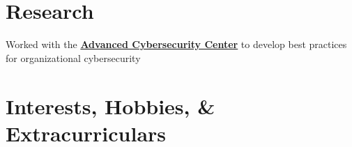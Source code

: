 \documentclass[letterpaper]{deedy-resume} %
\begin{document}
\begin{minipage}[t]{0.66\textwidth}






\section{Research}


Worked with the \textbf{\href{http://www.acscenter.org/}{Advanced Cybersecurity Center}} to develop best practices for organizational cybersecurity

\sectionspace %






\section{Interests, Hobbies, \& Extracurriculars}


\end{minipage}
\end{document}
